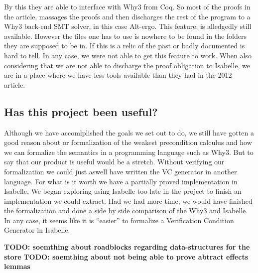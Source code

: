By this they are able to interface with Why3 from Coq.
So most of the proofs in the article, massages the proofs and then discharges the rest of the program to a Why3 back-end SMT solver, in this case Alt-ergo.
This feature, is alledgedly still available\cite{TODO:LIERS}. However the files one has to use is nowhere to be found in the folders they are supposed to be in.
If this is a relic of the past or badly documented is hard to tell. In any case, we were not able to get this feature to work.
When also considering that we are not able to discharge the proof obligation to Isabelle, we are in a place where we have less tools available than they had in the 2012 article.

\subsection{Has this project been useful?}
Although we have accomlplished the goals we set out to do, we still have gotten a good reason about or formalization of the weakest precondition calculus and how we can formalize the semantics in a programming language such as Why3.
But to say that our product is useful would be a stretch. Without verifying our formalization we could just aswell have written the VC generator in another language.
For what is it worth we have a partially proved implementation in Isabelle.
We began exploring using Isabelle too late in the project to finish an implementation we could extract.
Had we had more time, we would have finished the formalization and done a side by side comparison of the Why3 and Isabelle.
In any case, it seems like it is ``easier'' to formalize a Verification Condition Generator in Isabelle.

\textbf{TODO: soemthing about roadblocks regarding data-structures for the store}
\textbf{TODO: soemthing about not being able to prove abtract effects lemmas}

